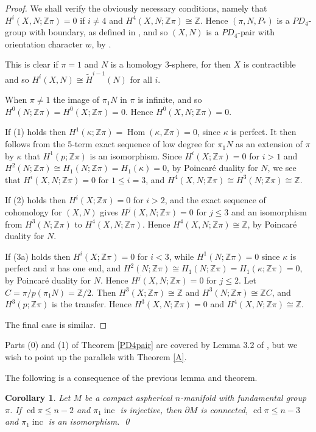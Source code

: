 \documentclass[12pt]{amsart}
\renewcommand{\leq}{\leqslant}
\newtheorem{corollary}[theorem]{Corollary}
\theoremstyle{definition}
\newcommand{\Z}{\mathbb Z}
\DeclareMathOperator{\cd}{cd}
\DeclareMathOperator{\Hom}{Hom}
\DeclareMathOperator{\inc}{inc}
\begin{document}
\begin{proof}
We shall verify the obviously necessary conditions,
namely that $H^i(X,N;\Z\pi)=0$ if $i\not=4$ and $H^4(X,N;\Z\pi)\cong\Z$.
Hence $(\pi,N,P_*)$ is a $PD_4$-group with boundary,
as defined in \cite{dh1}, and so $(X,N)$ is a $PD_4$-pair with orientation character $w$,
by \cite[Theorem 4]{dh1}.


This is clear if $\pi=1$ and $N$ is a homology $3$-sphere, 
for then $X$ is contractible and so
$H^i(X,N)\cong\widetilde{H}^{i-1}(N)$ for all $i$.

When $\pi\not=1$ the image of $\pi_1N$ in $\pi$ is infinite,
and so $H^0(N;\Z\pi)=H^0(X;\Z\pi)=0$.
Hence $H^0(X,N;\Z\pi)=0$.

If (1) holds then $H^1(\kappa;\Z\pi)=\Hom(\kappa,\Z\pi)=0$,
since $\kappa$ is perfect. 
It then follows from the 5-term exact sequence of low degree
for $\pi_1N$ as an extension of $\pi$ by $\kappa$ that $H^1(p;\Z\pi)$
is an isomorphism.
Since $H^i(X;\Z\pi)=0$ for $i>1$ and
$H^2(N;\Z\pi)\cong H_1(N;\Z\pi) = {H_1(\kappa)}=0$, 
by Poincar\'e duality for $N$,
we see that $H^i(X,N;\Z\pi)=0$ for $1\leq{i}=3$,
and $H^4(X,N;\Z\pi)\cong{H^3(N;\Z\pi)}\cong\Z$.

If (2) holds then $H^i(X;\Z\pi)=0$ for $i>2$, 
and the exact sequence of cohomology for $(X,N)$ gives $H^j(X,N;\Z\pi)=0$ 
for $j\leq3$ and an isomorphism from $H^3(N;\Z\pi)$ to $H^4(X,N;\Z\pi)$.
Hence $H^4(X,N;\Z\pi)\cong\Z$, by Poincar\'e duality for $N$.

If (3a) holds then $H^i(X;\Z\pi)=0$ for $i<3$, 
while $H^1(N;\Z\pi)=0$ since $\kappa$ is perfect and $\pi$ has one end,
and $H^2(N;\Z\pi)\cong{H_1(N;\Z\pi)}=H_1(\kappa;\Z\pi)=0$, by Poincar\'e duality for $N$.
Hence $H^j(X,N;\Z\pi)=0$ for $j\leq2$.
Let $C=\pi/p(\pi_1N)=\Z/2$.
Then $H^3(X;\Z\pi)\cong\Z$ and $H^3(N;\Z\pi)\cong\Z{C}$, 
and $H^3(p;\Z\pi)$ is the transfer.
Hence $H^3(X,N;\Z\pi)=0$ and $H^4(X,N;\Z\pi)\cong\Z$.

The final case is similar.
\end{proof}

Parts (0) and (1) of Theorem \ref{PD4pair} are covered by Lemma 3.2 of \cite{FT05},
but we wish to point up the parallels with Theorem \ref{A}.

The following is a consequence of the previous lemma and theorem.

\begin{corollary}
\label{pi-inc inj}
Let $M$ be a compact aspherical $n$-manifold with fundamental group $\pi$.
If $\cd\pi\leq{n-2}$ and $\pi_1\inc$ is injective, then
$\partial{M}$ is connected,
$\cd\pi\leq{n-3}$ and $\pi_1\inc$ is an isomorphism.
\qed
\end{corollary}
\end{document}
